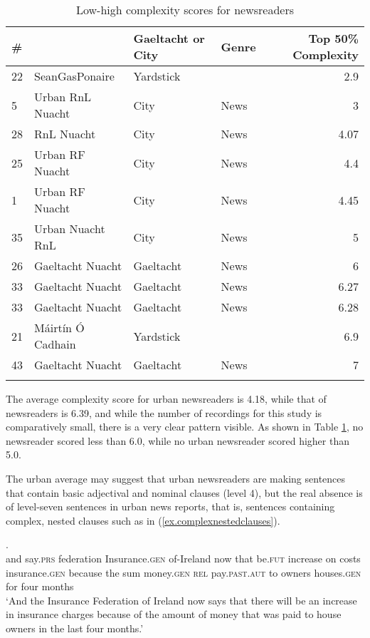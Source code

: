 \documentclass[output=paper,colorlinks,citecolor=brown]{langscibook}
\begin{document}
\begin{table}
\begin{tabular}{llllr}
\lsptoprule
\#  &                   & Gaeltacht or City & Genre & Top 50\% Complexity \\
\midrule
22 & SeanGasPonaire    & Yardstick &      & 2.9 \\
5  & Urban RnL Nuacht  & City      & News & 3 \\
28 & RnL Nuacht        & City      & News & 4.07 \\
25 & Urban RF Nuacht   & City      & News & 4.4 \\
1  & Urban RF Nuacht   & City      & News & 4.45 \\
35 & Urban Nuacht RnL  & City      & News & 5 \\
\midrule
26 & Gaeltacht Nuacht  & Gaeltacht & News & 6 \\
33 & Gaeltacht Nuacht  & Gaeltacht & News & 6.27 \\
33 & Gaeltacht Nuacht  & Gaeltacht & News & 6.28 \\
21 & Máirtín Ó Cadhain & Yardstick &      & 6.9 \\
43 & Gaeltacht Nuacht  & Gaeltacht & News & 7 \\
\lspbottomrule
\end{tabular}
\caption{Low-high complexity scores for newsreaders}
\label{fig:OBroin:3}
\end{table}

The average complexity score for urban newsreaders is 4.18, while that of  newsreaders is 6.39, and while the number of recordings for this study is comparatively small, there is a very clear pattern visible. As shown in Table \ref{fig:OBroin:3}, no  newsreader scored less than 6.0, while no urban newsreader scored higher than 5.0.

The urban average may suggest that urban newsreaders are making sentences that contain basic adjectival and nominal clauses (level 4), but the real absence is of level-seven sentences in urban news reports, that is, sentences containing complex, nested clauses such as in (\ref{ex.complexnestedclauses}).


\ea\label{ex.complexnestedclauses}
.\\
and say.\textsc{prs} federation Insurance.\textsc{gen} of-Ireland now that be.\textsc{fut} increase on costs insurance.\textsc{gen} because the sum money.\textsc{gen} \textsc{rel} pay.\textsc{past.aut} to owners houses.\textsc{gen} for four months\\
\glt ‘And the Insurance Federation of Ireland now says that there will be an increase in insurance charges because of the amount of money that was paid to house owners in the last four months.’
\z
\end{document}

